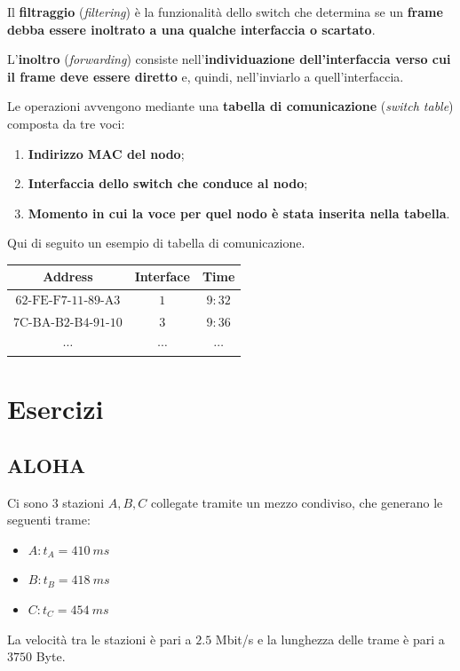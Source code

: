 \documentclass[a4paper]{article}
\begin{document}
	Il \textcolor{Red3}{\textbf{filtraggio}} (\emph{filtering}) è la funzionalità dello switch che determina se un \textbf{frame debba essere inoltrato a una qualche interfaccia o scartato}.\newline
	
	\noindent
	L’\textcolor{Red3}{\textbf{inoltro}} (\emph{forwarding}) consiste nell’\textbf{individuazione dell’interfaccia verso cui il frame deve essere diretto} e, quindi, nell’inviarlo a quell’interfaccia.\newline
	
	\noindent
	Le operazioni avvengono mediante una \textbf{tabella di comunicazione} (\emph{switch table}) composta da tre voci:
	\begin{enumerate}
		\item \textbf{Indirizzo MAC del nodo};
		\item \textbf{Interfaccia dello switch che conduce al nodo};
		\item \textbf{Momento in cui la voce per quel nodo è stata inserita nella tabella}.
	\end{enumerate}
	Qui di seguito un esempio di tabella di comunicazione.
	\begin{table}[!htbp]
		\centering
		\begin{tabular}{@{} c c c @{}}
			\toprule
			Address	& Interface	& Time \\
			\midrule
			$\mathrm{62\text{-}FE\text{-}F7\text{-}11\text{-}89\text{-}A3}$	& $1$ 		& $9:32$ \\
			$\mathrm{7C\text{-}BA\text{-}B2\text{-}B4\text{-}91\text{-}10}$	& $3$ 		& $9:36$ \\
			$\cdots$														& $\cdots$ 	& $\cdots$ \\
			\bottomrule
		\end{tabular}
	\end{table}\newpage

	\section{\textcolor{Red3}{Esercizi}}
	
	\subsection{\textcolor{Red3}{ALOHA}}
	
	Ci sono $3$ stazioni $A,B,C$ collegate tramite un mezzo condiviso, che generano le seguenti trame:
	\begin{itemize}[label=-]
		\item $A: t_{A} = 410 \: ms$
		\item $B: t_{B} = 418 \: ms$
		\item $C: t_{C} = 454 \: ms$
	\end{itemize}
	La velocità tra le stazioni è pari a $2.5$ Mbit/s e la lunghezza delle trame è pari a $3750$ Byte.\newline
	
\end{document}
